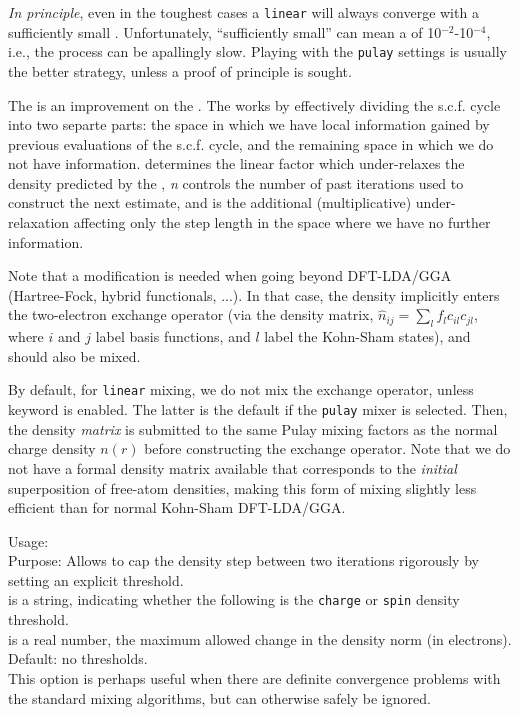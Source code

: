 \emph{In principle}, even in the toughest cases
a \texttt{linear}  will always converge with a
sufficiently small . Unfortunately,
``sufficiently small'' can mean a  of
10$^{-2}$-10$^{-4}$, i.e., the process can be apallingly slow. Playing
with the \texttt{pulay}  settings is usually the better
strategy, unless a proof of principle is sought.

The   is an improvement on the  . The   works by effectively dividing the s.c.f. cycle into two separte parts: the space in which we have local information gained by previous evaluations of the s.c.f. cycle, and the remaining space in which we do not have information.  determines the linear factor which under-relaxes the density predicted by the  ,  \emph{n} controls the number of past iterations used to construct the next estimate, and  is the additional (multiplicative) under-relaxation affecting only the step length in the space where we have no further information.

Note that a modification is needed when going beyond DFT-LDA/GGA
(Hartree-Fock, hybrid functionals, ...). In
that case, the density implicitly enters the two-electron exchange
operator (via the density matrix,
$\hat{n}_{ij}=\sum_l f_l c_{il} c_{jl}$, where
$i$ and $j$ label basis functions, and $l$ label the Kohn-Sham
states), and should also be mixed.

By default, for \texttt{linear}
mixing, we do not mix the exchange operator, unless keyword
 is enabled. The latter is the
default if the \texttt{pulay} mixer is selected. Then, the
density \emph{matrix} is submitted to the same Pulay mixing factors as
the normal charge density $n(r)$ before constructing the exchange
operator. Note that we do not have a formal density matrix
available that corresponds to the \emph{initial} superposition of
free-atom densities, making this form of mixing slightly less
efficient than for normal Kohn-Sham DFT-LDA/GGA.

{
  \noindent 
  Usage:  
     \\[1.0ex] 
  Purpose: Allows to cap the density step between two iterations
    rigorously by setting an explicit threshold. \\[1.0ex]
   is a string, indicating whether the following is
    the \texttt{charge} or \texttt{spin} density threshold. \\
   is a real number, the maximum allowed change in
    the density norm (in electrons). Default: no thresholds. \\
}
This option is perhaps useful when there are definite convergence
problems with the standard mixing algorithms, but can otherwise safely
be ignored.

